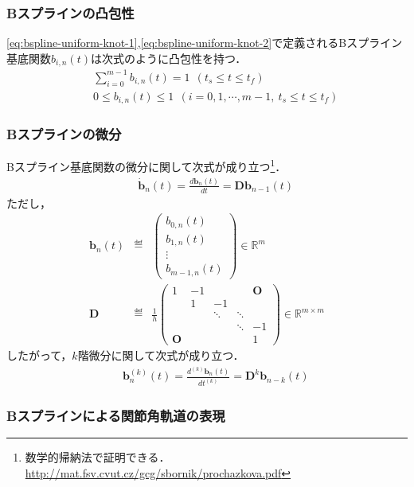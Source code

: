 \subsubsection*{Bスプラインの凸包性}

\eqref{eq:bspline-uniform-knot-1},\eqref{eq:bspline-uniform-knot-2}で定義されるBスプライン基底関数$b_{i,n}(t)$は次式のように凸包性を持つ．
\begin{eqnarray}
  &&\sum_{i=0}^{m-1} b_{i,n}(t) = 1 \ \ (t_s \leq t \leq t_f) \label{eq:bspline-convex-1} \\
  &&0 \leq b_{i,n}(t) \leq 1 \ \ (i = 0,1,\cdots,m-1, \ t_s \leq t \leq t_f) \label{eq:bspline-convex-2}
\end{eqnarray}

\subsubsection*{Bスプラインの微分}

Bスプライン基底関数の微分に関して次式が成り立つ\footnote{数学的帰納法で証明できる．\url{http://mat.fsv.cvut.cz/gcg/sbornik/prochazkova.pdf}}．
\begin{eqnarray}
  &&\bm{\dot{b}}_n(t) = \frac{d \bm{b}_n(t)}{d t} = \bm{D} \bm{b}_{n-1}(t) \label{eq:bspline-derivative}
\end{eqnarray}
ただし，
\begin{eqnarray}
  \bm{b}_n(t) &\eqdef& \begin{pmatrix} b_{0,n}(t) \\ b_{1,n}(t) \\ \vdots \\ b_{m-1,n}(t) \end{pmatrix} \in \mathbb{R}^m \\
  \bm{D} &\eqdef& \frac{1}{h} \begin{pmatrix} 1 & -1 &&&\bm{O}\\ & 1 & -1 &&\\&&\ddots&\ddots&\\&&&\ddots&-1\\\bm{O}&&&&1\end{pmatrix} \in \mathbb{R}^{m \times m}
\end{eqnarray}
したがって，$k$階微分に関して次式が成り立つ．
\begin{eqnarray}
  &&\bm{b}_n^{(k)}(t) = \frac{d^{(k)} \bm{b}_n(t)}{d t^{(k)}} = \bm{D}^k \bm{b}_{n-k}(t) \label{eq:bspline-derivative-k}
\end{eqnarray}

\subsubsection*{Bスプラインによる関節角軌道の表現}

